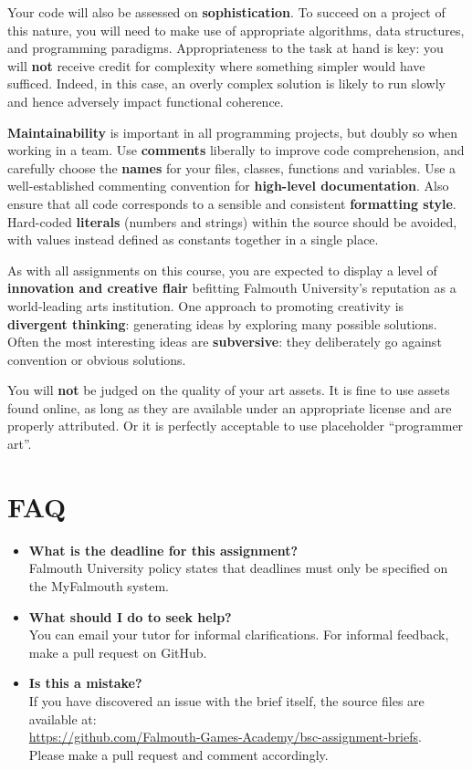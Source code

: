 \documentclass{../../fal_assignment}
\begin{document}
Your code will also be assessed on \textbf{sophistication}.
To succeed on a project of this nature,
you will need to make use of appropriate algorithms, data structures, and programming paradigms.
Appropriateness to the task at hand is key:
you will \textbf{not} receive credit for complexity  
where something simpler would have sufficed.
Indeed, in this case, an overly complex solution is likely to run slowly and hence
adversely impact functional coherence.

\textbf{Maintainability} is important in all programming projects,
but doubly so when working in a team.
Use \textbf{comments} liberally to improve code comprehension,
and carefully choose the \textbf{names} for your files, classes, functions and variables.
Use a well-established commenting convention
for \textbf{high-level documentation}.
Also ensure that all code corresponds to a sensible and consistent \textbf{formatting style}.
Hard-coded \textbf{literals} (numbers and strings) within the source should be avoided,
with values instead defined as constants together in a single place.

As with all assignments on this course, you are expected to display a level of
\textbf{innovation and creative flair} befitting Falmouth University's reputation as a world-leading
arts institution.
One approach to promoting creativity is
\textbf{divergent thinking}: generating ideas by exploring many possible solutions.
Often the most interesting ideas are \textbf{subversive}: they deliberately go against
convention or obvious solutions.

You will \textbf{not} be judged on the quality of your art assets.
It is fine to use assets found online,
as long as they are available under an appropriate license and are properly attributed.
Or it is perfectly acceptable to use placeholder ``programmer art''.

\section*{FAQ}

\begin{itemize}
	\item 	\textbf{What is the deadline for this assignment?} \\ 
    		Falmouth University policy states that deadlines must only be specified on the MyFalmouth system.
    		
	\item 	\textbf{What should I do to seek help?} \\ 
    		You can email your tutor for informal clarifications. For informal feedback, make a pull request on GitHub. 
    		
    	\item 	\textbf{Is this a mistake?} \\ 	
    		If you have discovered an issue with the brief itself, the source files are available at: \\
    		\url{https://github.com/Falmouth-Games-Academy/bsc-assignment-briefs}.\\
    		 Please make a pull request and comment accordingly.
\end{itemize}
\end{document}

